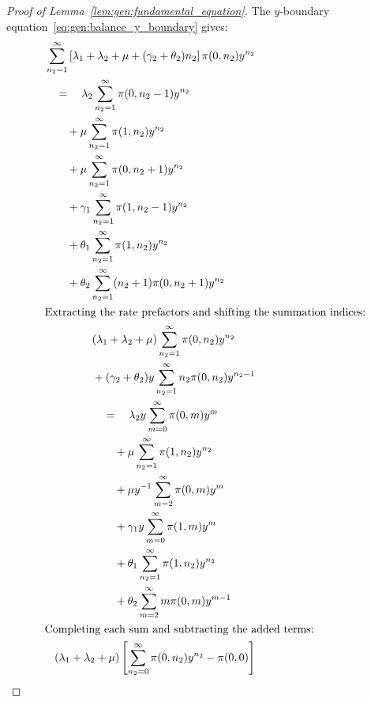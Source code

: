\begin{proof}[Proof of Lemma~\ref{lem:gen:fundamental_equation}]
    The $y$-boundary equation~\eqref{eq:gen:balance_y_boundary} gives:
    \begin{align}
        \begin{split}
            & \sum_{n_2=1}^{\infty} \left[ \lambda_1 + \lambda_2 + \mu + (\gamma_2 + \theta_2) n_2 \right] \pi(0, n_2) y^{n_2} \\
            & \quad = \quad \lambda_2 \sum_{n_2=1}^{\infty} \pi(0, n_2-1) y^{n_2} \\
            & \quad \quad + \mu \sum_{n_2=1}^{\infty} \pi(1, n_2) y^{n_2} \\
            & \quad \quad + \mu \sum_{n_2=1}^{\infty} \pi(0, n_2+1) y^{n_2} \\
            & \quad \quad + \gamma_1 \sum_{n_2=1}^{\infty} \pi(1, n_2-1) y^{n_2} \\
            & \quad \quad + \theta_1 \sum_{n_2=1}^{\infty} \pi(1, n_2) y^{n_2} \\
            & \quad \quad + \theta_2 \sum_{n_2=1}^{\infty} (n_2+1) \pi(0, n_2+1) y^{n_2}
        \end{split} \nonumber \\
        \intertext{Extracting the rate prefactors and shifting the summation indices:}
        \begin{split}
            & (\lambda_1 + \lambda_2 + \mu) \sum_{n_2=1}^{\infty} \pi(0, n_2) y^{n_2} \\
            & + (\gamma_2 + \theta_2) y \sum_{n_2=1}^{\infty} n_2 \pi(0, n_2) y^{n_2-1} \\
            & \quad = \quad \lambda_2 y \sum_{m=0}^{\infty} \pi(0, m) y^{m} \\
            & \quad \quad + \mu \sum_{n_2=1}^{\infty} \pi(1, n_2) y^{n_2} \\
            & \quad \quad + \mu y^{-1} \sum_{m=2}^{\infty} \pi(0, m) y^{m} \\
            & \quad \quad + \gamma_1 y \sum_{m=0}^{\infty} \pi(1, m) y^{m} \\
            & \quad \quad + \theta_1 \sum_{n_2=1}^{\infty} \pi(1, n_2) y^{n_2} \\
            & \quad \quad + \theta_2 \sum_{m=2}^{\infty} m \pi(0, m) y^{m-1}
        \end{split} \nonumber \\
        \intertext{Completing each sum and subtracting the added terms:}
        \begin{split}
            & (\lambda_1 + \lambda_2 + \mu) \left[ \sum_{n_2=0}^{\infty} \pi(0, n_2) y^{n_2} - \pi(0,0) \right] \\

\end{split}
\end{align}
\end{proof}
